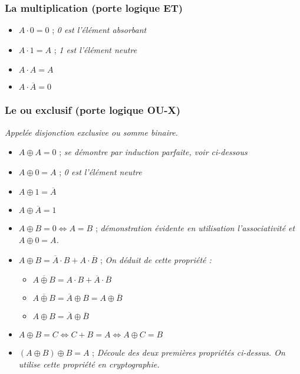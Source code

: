 \documentclass[a4paper,11pt]{book}
\theoremstyle{definition}
\theoremstyle{definition}
\begin{document}
\subsubsection{La multiplication (porte logique ET)}
\begin{itemize}
    \item $A \cdot 0 = 0$ ; \emph{0 est l'élément absorbant}
    \item $A \cdot 1 = A$ ; \emph{1 est l'élément neutre}
    \item $A \cdot A = A$
    \item $A \cdot \overline{A} = 0$
\end{itemize}
\subsubsection{Le ou exclusif (porte logique OU-X)}
\emph{Appelée disjonction exclusive ou somme binaire.}
\begin{itemize}
    \item $A \oplus A = 0$ ; \emph{se démontre par induction parfaite, voir ci-dessous}
    \item $A \oplus 0 = A$ ; \emph{0 est l'élément neutre}
    \item $A \oplus 1 = \overline{A}$ 
    \item $A \oplus \overline{A} = 1$ \\
    
    \item $A \oplus B = 0 \Leftrightarrow A = B$ ; \emph{démonstration évidente en utilisation l'associativité et $A \oplus 0 = A$.}
    \item $A \oplus B = \overline{A}\cdot B + A\cdot \overline{B}$ ; \emph{On déduit de cette propriété :}
    \begin{itemize}
        \item $\overline{A \oplus B} = A \cdot B + \overline{A} \cdot \overline{B}$
        \item $\overline{A \oplus B} = \overline{A} \oplus B = A \oplus \overline{B}$
        \item $A \oplus B = \overline{A} \oplus \overline{B}$
    \end{itemize}
    \item $A \oplus B = C \Leftrightarrow C + B = A \Leftrightarrow A \oplus C = B $
    \item $(A \oplus B) \oplus B = A$ ; \emph{Découle des deux premières propriétés ci-dessus. On utilise cette propriété en cryptographie.}
\end{itemize}
\end{document}
